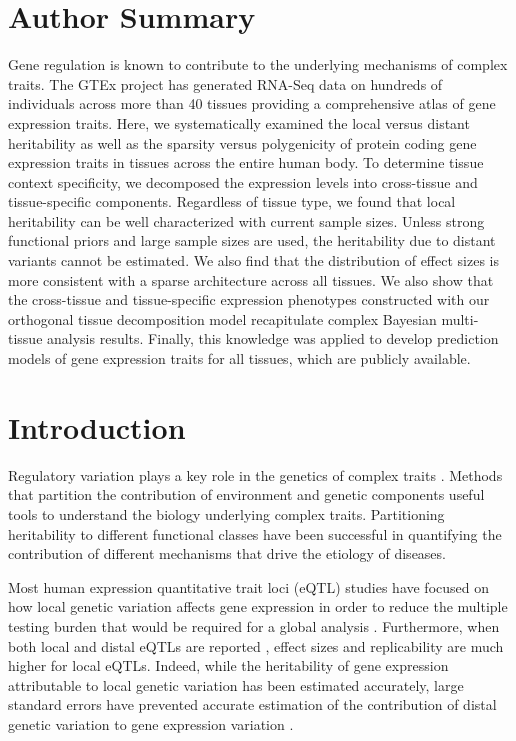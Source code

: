\documentclass[10pt,letterpaper]{article}
\begin{document}
\section*{Author Summary}
Gene regulation is known to contribute to the underlying mechanisms of complex traits. The GTEx project has generated RNA-Seq data on hundreds of individuals across more than 40 tissues providing a comprehensive atlas of gene expression traits. Here, we systematically examined the local versus distant heritability as well as the sparsity versus polygenicity of protein coding gene expression traits in tissues across the entire human body. To determine tissue context specificity, we decomposed the expression levels into cross-tissue and tissue-specific components. Regardless of tissue type, we found that local heritability can be well characterized with current sample sizes. Unless strong functional priors and large sample sizes are used, the heritability due to distant variants cannot be estimated. We also find that the distribution of effect sizes is more consistent with a sparse architecture across all tissues. We also show that the cross-tissue and tissue-specific expression phenotypes constructed with our orthogonal tissue decomposition model recapitulate complex Bayesian multi-tissue analysis results. Finally, this knowledge was applied to develop prediction models of gene expression traits for all tissues, which are publicly available.

\linenumbers

\section*{Introduction}
Regulatory variation plays a key role in the genetics of complex traits \cite{Nicolae_2010, Nica_2010, Gusev_2014}. Methods that partition the contribution of environment and genetic components useful tools to understand the biology underlying complex traits. Partitioning heritability to different functional classes have been successful in quantifying the contribution of different mechanisms that drive the etiology of diseases.

Most human expression quantitative trait loci (eQTL) studies have focused on how local genetic variation affects gene expression in order to reduce the multiple testing burden that would be required for a global analysis \cite{Albert_2015, Stranger_2012}. Furthermore, when both local and distal eQTLs are reported \cite{Stranger_2007,Innocenti_2011,Wright_2014}, effect sizes and replicability are much higher for local eQTLs. Indeed, while the heritability of gene expression attributable to local genetic variation has been estimated accurately, large standard errors have prevented accurate estimation of the contribution of distal genetic variation to gene expression variation \cite{Wright_2014,Price_2011}. 
\end{document}
